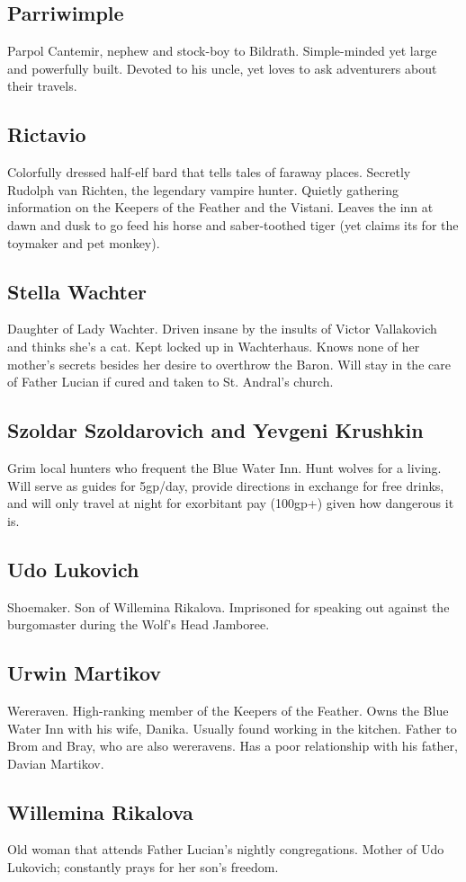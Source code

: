 \documentclass[a4paper,11pt]{article}
\begin{document}
\subsection{Parriwimple}
  Parpol Cantemir, nephew and stock-boy to Bildrath. Simple-minded yet large and powerfully built. Devoted to 
  his uncle, yet loves to ask adventurers about their travels.
\subsection{Rictavio}
  Colorfully dressed half-elf bard that tells tales of faraway places. Secretly Rudolph van Richten, the
  legendary vampire hunter. Quietly gathering information on the Keepers of the Feather and the Vistani. Leaves
  the inn at dawn and dusk to go feed his horse and saber-toothed tiger (yet claims its for the toymaker and pet
  monkey).
\subsection{Stella Wachter}
  Daughter of Lady Wachter. Driven insane by the insults of Victor Vallakovich and thinks she's a cat. Kept 
  locked up in Wachterhaus. Knows none of her mother's secrets besides her desire to overthrow the Baron. Will
  stay in the care of Father Lucian if cured and taken to St. Andral's church.
\subsection{Szoldar Szoldarovich and Yevgeni Krushkin}
  Grim local hunters who frequent the Blue Water Inn. Hunt wolves for a living. Will serve as guides for 5gp/day,
  provide directions in exchange for free drinks, and will only travel at night for exorbitant pay (100gp+) given
  how dangerous it is.
\subsection{Udo Lukovich}
  Shoemaker. Son of Willemina Rikalova. Imprisoned for speaking out against the burgomaster during the Wolf's
  Head Jamboree.
\subsection{Urwin Martikov}
  Wereraven. High-ranking member of the Keepers of the Feather. Owns the Blue Water Inn with his wife, Danika. 
  Usually found working in the kitchen. Father to Brom and Bray, who are also wereravens. Has a poor 
  relationship with his father, Davian Martikov.
\subsection{Willemina Rikalova}
  Old woman that attends Father Lucian's nightly congregations. Mother of Udo Lukovich; constantly prays for her
  son's freedom.
  
\end{document}
